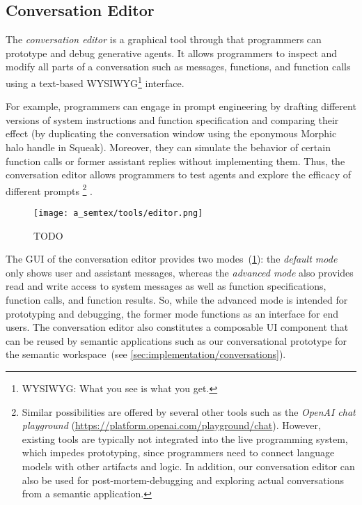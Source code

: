 \subsection{Conversation Editor}
\label{sec:semtex/tools/editor}

The \emph{conversation editor} is a graphical tool through that programmers can prototype and debug generative agents.
It allows programmers to inspect and modify all parts of a conversation such as messages, functions, and function calls using a text-based WYSIWYG\footnote{WYSIWYG: What you see is what you get.} interface.

For example, programmers can engage in prompt engineering by drafting different versions of system instructions and function specification and comparing their effect (by duplicating the conversation window using the eponymous Morphic halo handle in Squeak).
Moreover, they can simulate the behavior of certain function calls or former assistant replies without implementing them.
Thus, the conversation editor allows programmers to test agents and explore the efficacy of different prompts%
\footnote{%
	Similar possibilities are offered by several other tools such as the \emph{OpenAI chat playground} (\url{https://platform.openai.com/playground/chat}).
	However, existing tools are typically not integrated into the live programming system, which impedes prototyping, since programmers need to connect language models with other artifacts and logic.
	In addition, our conversation editor can also be used for post-mortem-debugging and exploring actual conversations from a semantic application.
}%
.

\begin{figure}
	\centering
	\texttt{[image: a\_semtex/tools/editor.png]}
	\caption[TODO]{
		TODO
	}
	\label{fig:semtex/tools/editor}
\end{figure}

The GUI of the conversation editor provides two modes~(\cref{fig:semtex/tools/editor}):
the \emph{default mode} only shows user and assistant messages, whereas the \emph{advanced mode} also provides read and write access to system messages as well as function specifications, function calls, and function results.
So, while the advanced mode is intended for prototyping and debugging, the former mode functions as an interface for end users.
The conversation editor also constitutes a composable UI component that can be reused by semantic applications such as our conversational prototype for the semantic workspace~(see \cref{sec:implementation/conversations}).

